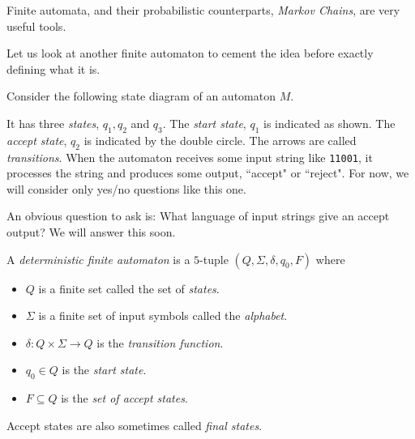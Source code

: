 Finite automata, and their probabilistic counterparts, \textit{Markov Chains}, are very useful tools.

Let us look at another finite automaton to cement the idea before exactly defining what it is.

\begin{example}
Consider the following state diagram of an automaton $M$.
\begin{center}
\end{center}
It has three \textit{states}, $q_1, q_2$ and $q_3$. The \textit{start state}, $q_1$ is indicated as shown. The \textit{accept state}, $q_2$ is indicated by the double circle. The arrows are called \textit{transitions}. When the automaton receives some input string like \texttt{11001}, it processes the string and produces some output, ``accept" or ``reject". For now, we will consider only yes/no questions like this one.

An obvious question to ask is: What language of input strings give an accept output? We will answer this soon.
\end{example}

\begin{definition}
A \textit{deterministic finite automaton} is a $5$-tuple $(Q,\Sigma, \delta, q_0, F)$ where
\begin{itemize}
    \item $Q$ is a finite set called the set of \textit{states}.
    \item $\Sigma$ is a finite set of input symbols called the \textit{alphabet}.
    \item $\delta:Q\times\Sigma\to Q$ is the \textit{transition function}.
    \item $q_0\in Q$ is the \textit{start state}.
    \item $F\subseteq Q$ is the \textit{set of accept states}.
\end{itemize}
\end{definition}

Accept states are also sometimes called \textit{final states}.

